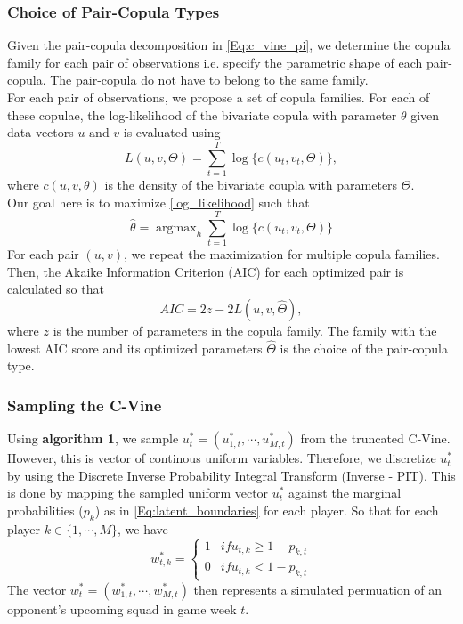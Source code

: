 \documentclass[12pt,oneside,a4paper]{book}
\theoremstyle{definition}
\theoremstyle{remark}
\DeclareMathOperator*{\argmax}{argmax}
\begin{document}
				\subsubsection{Choice of Pair-Copula Types}
				Given the pair-copula decomposition in \ref{Eq:c_vine_pi}, we determine the copula family for each pair of observations i.e. specify the parametric shape of each pair-copula. The pair-copula do not have to belong to the same family.\\
				For each pair of observations, we propose a set of copula families. For each of these copulae, the log-likelihood of the bivariate copula with parameter $\theta$ given data vectors $u \text{ and } v$ is evaluated using
				\begin{equation}\label{log_likelihood}
					L\left(u, v,\Theta \right) = \sum_{t=1}^{T} \log \{c\left( u_t, v_t, \Theta \right)\},
				\end{equation}
				where $c\left(u,v,\theta \right)$ is the density of the bivariate coupla with parameters $\Theta$.\\
				Our goal here is to maximize \ref{log_likelihood} such that
				\begin{equation}
					\hat{\theta} = \argmax_{h} \sum_{t=1}^{T} \log \{c \left(u_t,v_t,\Theta \right) \}
				\end{equation}
				For each pair $\left(u,v\right)$, we repeat the maximization for multiple copula families. Then, the Akaike Information Criterion (AIC) for each optimized pair is calculated so that
				\begin{equation}
					AIC = 2z - 2L\left(u,v, \hat{\Theta}\right),
				\end{equation}
				where $z$ is the number of parameters in the copula family.
				The family with the lowest AIC score and its optimized parameters $\hat{\Theta}$ is the choice of the pair-copula type.

				\subsubsection{Sampling the C-Vine}
				Using \textbf{algorithm 1}, we sample $u_t^* = (u_{1,t}^*, \cdots, u_{M,t}^*)$ from the truncated C-Vine. However, this is vector of continous uniform variables. Therefore, we discretize $u_t^*$ by using the Discrete Inverse Probability Integral Transform (Inverse - PIT).
				This is done by mapping the sampled uniform vector $u_t^*$ against the marginal probabilities ($p_k$) as in \ref{Eq:latent_boundaries} for each player. So that for each player $k \in \{1, \cdots, M\}$, we have
				\begin{equation}
					w^*_{t,k} =
					\begin{cases}
						1 & if u_{t,k} \geqslant 1 - p_{k,t}\\
						0 & if u_{t,k} < 1 - p_{k,t}
					\end{cases}
				\end{equation}
				The vector $w^*_{t} = \left(w^*_{1,t}, \cdots, w^*_{M,t} \right)$ then represents a simulated permuation of an opponent's upcoming squad in game week $t$.
\end{document}
